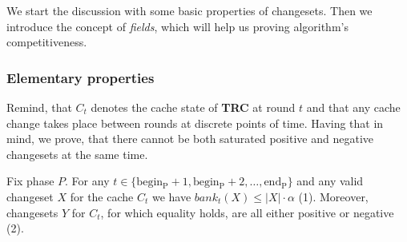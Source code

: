 We start the discussion with some basic properties of changesets. Then we 
introduce the concept of \textit{fields}, which will help us proving 
algorithm's competitiveness.

\subsubsection{Elementary properties}
Remind, that $C_t$ denotes the cache state of \textbf{TRC} at round $t$ and that 
any cache change takes place between rounds at discrete points of time. 
Having that in mind, we prove, that there cannot be both saturated 
positive and negative changesets at the same time.
\begin{lemma}
\label{thm:lemma1}
Fix phase $P$. For any $t \in \{\mathrm{begin_P} +1, \mathrm{begin_P} + 2, 
\ldots, \mathrm{end_P}\}$ and any valid changeset $X$ for the cache $C_t$ 
we have $bank_t(X) \leq |X| \cdot \alpha$ (1). Moreover, changesets $Y$ for
$C_t$, for which equality holds, are all either positive or negative (2).
\end{lemma}

